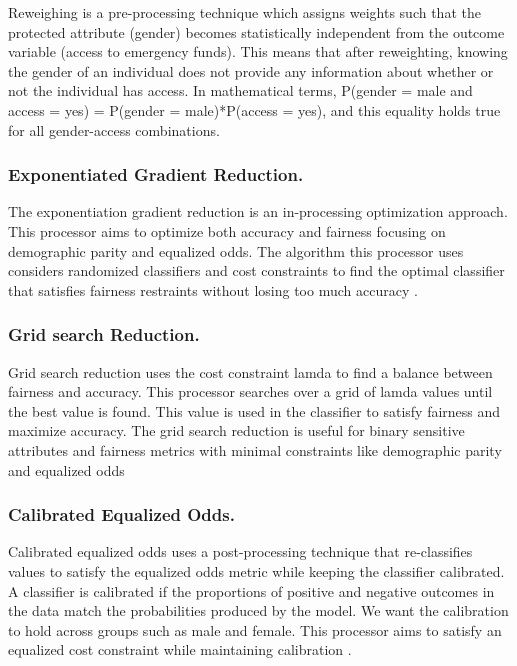 \documentclass[water,article,submit,moreauthors,pdftex]{mdpi}
\begin{document}
Reweighing is a pre-processing technique which assigns weights such that
the protected attribute (gender) becomes statistically independent from
the outcome variable (access to emergency funds). This means that after
reweighting, knowing the gender of an individual does not provide any
information about whether or not the individual has access. In
mathematical terms, P(gender = male and access = yes) = P(gender =
male)*P(access = yes), and this equality holds true for all
gender-access combinations.

\hypertarget{exponentiated-gradient-reduction.}{%
\subsubsection{Exponentiated Gradient
Reduction.}\label{exponentiated-gradient-reduction.}}

The exponentiation gradient reduction is an in-processing optimization
approach. This processor aims to optimize both accuracy and fairness
focusing on demographic parity and equalized odds. The algorithm this
processor uses considers randomized classifiers and cost constraints to
find the optimal classifier that satisfies fairness restraints without
losing too much accuracy \citep{agarwal2018reductions}.

\hypertarget{grid-search-reduction.}{%
\subsubsection{Grid search Reduction.}\label{grid-search-reduction.}}

Grid search reduction uses the cost constraint lamda to find a balance
between fairness and accuracy. This processor searches over a grid of
lamda values until the best value is found. This value is used in the
classifier to satisfy fairness and maximize accuracy. The grid search
reduction is useful for binary sensitive attributes and fairness metrics
with minimal constraints like demographic parity and equalized odds
\citep{agarwal2018reductions, agarwal2019fair}

\hypertarget{calibrated-equalized-odds.}{%
\subsubsection{Calibrated Equalized
Odds.}\label{calibrated-equalized-odds.}}

Calibrated equalized odds uses a post-processing technique that
re-classifies values to satisfy the equalized odds metric while keeping
the classifier calibrated. A classifier is calibrated if the proportions
of positive and negative outcomes in the data match the probabilities
produced by the model. We want the calibration to hold across groups
such as male and female. This processor aims to satisfy an equalized
cost constraint while maintaining calibration
\citep{pleiss2017fairness}.
\end{document}
